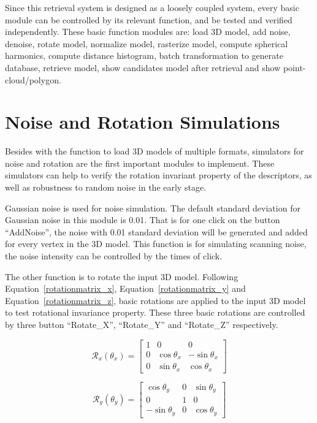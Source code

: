 Since this retrieval system is designed as a loosely coupled system, every basic module can be controlled by its relevant function, and be tested and verified independently. These basic function modules are: load 3D model, add noise, denoise, rotate model, normalize model, rasterize model, compute spherical harmonics, compute distance histogram, batch transformation to generate database, retrieve model, show candidates model after retrieval and show point-cloud/polygon. 

\section{Noise and Rotation Simulations}

Besides with the function to load 3D models of multiple formats, simulators for noise and rotation are the first important modules to implement. These simulators can help to verify the rotation invariant property of the descriptors, as well as robustness to random noise in the early stage.

Gaussian noise is used for noise simulation. The default standard deviation for Gaussian noise in this module is 0.01. That is for one click on the button ``AddNoise'', the noise with 0.01 standard deviation will be generated and added for every vertex in the 3D model. This function is for simulating scanning noise, the noise intensity can be controlled by the times of click. 

The other function is to rotate the input 3D model. Following Equation~\ref{rotationmatrix_x}, Equation~\ref{rotationmatrix_y} and Equation~\ref{rotationmatrix_z}, basic rotations are applied to the input 3D model to test rotational invariance property. These three basic rotations are controlled by three button ``Rotate\_X'', ``Rotate\_Y'' and ``Rotate\_Z'' respectively. 

\begin{equation} \label{rotationmatrix_x}
  \mathcal{R}_x(\theta_x)=
  \begin{bmatrix}
    1 & 0 & 0 \\
    0 &  \cos{\theta_x} &  -\sin{\theta_x} \\
    0 &  \sin{\theta_x} & \cos{\theta_x}
  \end{bmatrix}
\end{equation}

\begin{equation} \label{rotationmatrix_y}
  \mathcal{R}_y(\theta_y)=
  \begin{bmatrix}
    \cos{\theta_y} & 0 & \sin{\theta_y} \\
    0 & 1 & 0 \\
     -\sin{\theta_y} & 0 & \cos{\theta_y}
  \end{bmatrix} 
\end{equation}

